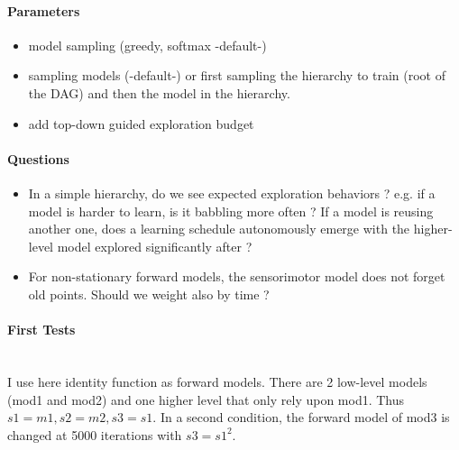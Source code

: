 \documentclass[12pt]{article}
\begin{document}
		\paragraph{Parameters}
		\begin{itemize}
			\item model sampling (greedy, softmax -default-)
			\item sampling models (-default-) or first sampling the hierarchy to train (root of the DAG) and then the model in the hierarchy.
			\item add top-down guided exploration budget
		\end{itemize}
		
		
		\paragraph{Questions}
		\begin{itemize}
			
			\item In a simple hierarchy, do we see expected exploration behaviors ? e.g. if a model is harder to learn, is it babbling more often ?
					If a model is reusing another one, does a learning schedule autonomously emerge with the higher-level model explored significantly after ?
			\item For non-stationary forward models, the sensorimotor model does not forget old points. Should we weight also by time ?
		
		\end{itemize}
		
		
		\paragraph{First Tests}~\\
		I use here identity function as forward models.
		There are 2 low-level models (mod1 and mod2) and one higher level that only rely upon mod1.
		Thus $s1=m1, s2=m2, s3=s1$.
		In a second condition, the forward model of mod3 is changed at 5000 iterations with $s3=s1^2$.
		
\end{document}
